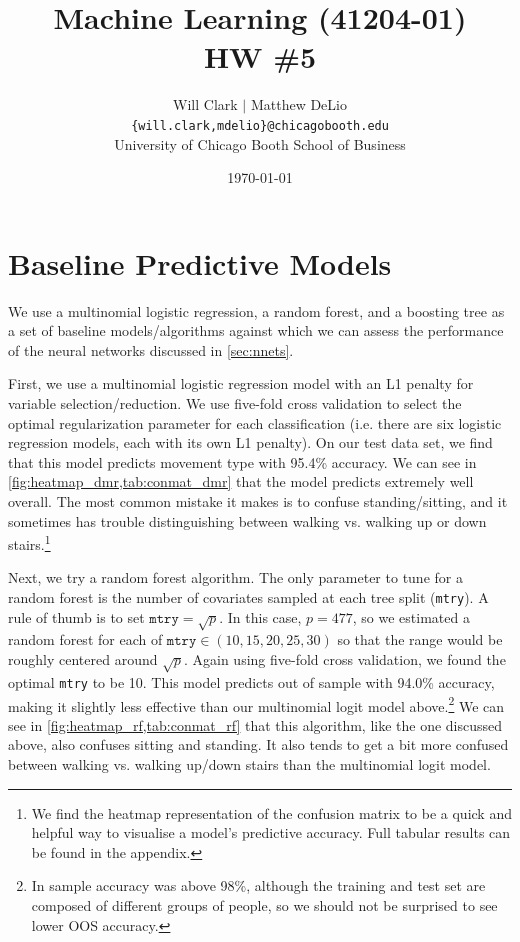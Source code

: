 



\title{Machine Learning (41204-01)\\HW \#5}
\author{Will Clark $\vert$ Matthew DeLio \\
\texttt{\{will.clark,mdelio\}@chicagobooth.edu} \\
University of Chicago Booth School of Business}
\date{\today}
\maketitle

\section{Baseline Predictive Models} \label{baseline}

We use a multinomial logistic regression, a random forest, and a boosting tree as a set of baseline models/algorithms against which we can assess the performance of the neural networks discussed in \vref{sec:nnets}. 

First, we use a multinomial logistic regression model with an L1 penalty for variable selection/reduction. We use five-fold cross validation to select the optimal regularization parameter for each classification (i.e. there are six logistic regression models, each with its own L1 penalty). On our test data set, we find that this model predicts movement type with 95.4\% accuracy. We can see in \vref{fig:heatmap_dmr,tab:conmat_dmr} that the model predicts extremely well overall. The most common mistake it makes is to confuse standing/sitting, and it sometimes has trouble distinguishing between walking vs. walking up or down stairs.\footnote{We find the heatmap representation of the confusion matrix to be a quick and helpful way to visualise a model's predictive accuracy. Full tabular results can be found in the appendix.}

Next, we try a random forest algorithm. The only parameter to tune for a random forest is the number of covariates sampled at each tree split (\texttt{mtry}). A rule of thumb is to set $\texttt{mtry}=\sqrt{p}$. In this case, $p=477$, so we estimated a random forest for each of $\texttt{mtry}\in(10, 15, 20, 25, 30)$ so that the range would be roughly centered around $\sqrt{p}$. Again using five-fold cross validation, we found the optimal \texttt{mtry} to be 10. This model predicts out of sample with 94.0\% accuracy, making it slightly less effective than our multinomial logit model above.\footnote{In sample accuracy was above 98\%, although the training and test set are composed of different groups of people, so we should not be surprised to see lower OOS accuracy.} We can see in \vref{fig:heatmap_rf,tab:conmat_rf} that this algorithm, like the one discussed above, also confuses sitting and standing. It also tends to get a bit more confused between walking vs. walking up/down stairs than the multinomial logit model.

